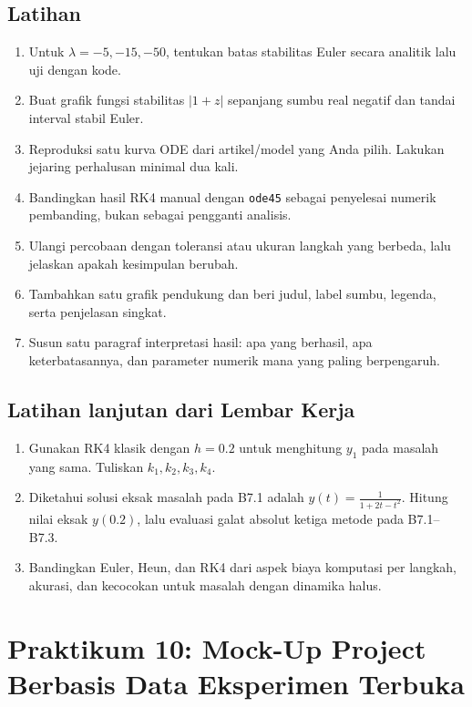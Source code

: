 \documentclass[book,english,noindex,lean,nobackpage,nocopyright,noupdate,nofiglist,notablist]{enacom}
\begin{document}
\section{Latihan}
\begin{enumerate}
\item Untuk $\lambda=-5,-15,-50$, tentukan batas stabilitas Euler secara analitik lalu uji dengan kode.
\item Buat grafik fungsi stabilitas $|1+z|$ sepanjang sumbu real negatif dan tandai interval stabil Euler.
\item Reproduksi satu kurva ODE dari artikel/model yang Anda pilih. Lakukan jejaring perhalusan minimal dua kali.
\item Bandingkan hasil RK4 manual dengan \texttt{ode45} sebagai penyelesai numerik pembanding, bukan sebagai pengganti analisis.

\item Ulangi percobaan dengan toleransi atau ukuran langkah yang berbeda, lalu jelaskan apakah kesimpulan berubah.
\item Tambahkan satu grafik pendukung dan beri judul, label sumbu, legenda, serta penjelasan singkat.
\item Susun satu paragraf interpretasi hasil: apa yang berhasil, apa keterbatasannya, dan parameter numerik mana yang paling berpengaruh.

\end{enumerate}

\section{Latihan lanjutan dari Lembar Kerja}
\begin{enumerate}
\item[\textbf{B7.3 (L3)}] Gunakan RK4 klasik dengan \(h=0.2\) untuk menghitung \(y_1\) pada masalah yang sama. Tuliskan \(k_1,k_2,k_3,k_4\).
\item[\textbf{B7.4 (L4)}] Diketahui solusi eksak masalah pada B7.1 adalah \(y(t)=\frac{1}{1+2t-t^2}\). Hitung nilai eksak \(y(0.2)\), lalu evaluasi galat absolut ketiga metode pada B7.1--B7.3.
\item[\textbf{B7.5 (L5)}] Bandingkan Euler, Heun, dan RK4 dari aspek biaya komputasi per langkah, akurasi, dan kecocokan untuk masalah dengan dinamika halus.
\end{enumerate}


\chapter{Praktikum 10: Mock-Up Project Berbasis Data Eksperimen Terbuka}
\end{document}
